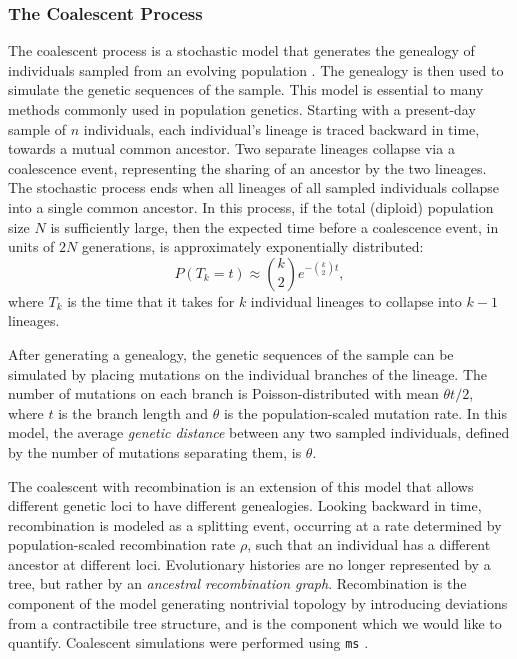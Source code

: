\subsubsection{The Coalescent Process}

The coalescent process is a stochastic model that generates the genealogy of individuals sampled from an evolving population \cite{Wakeley:2009}.
The genealogy is then used to simulate the genetic sequences of the sample.
This model is essential to many methods commonly used in population genetics.
Starting with a present-day sample of $n$ individuals, each individual's lineage is traced backward in time, towards a mutual common ancestor.
Two separate lineages collapse via a coalescence event, representing the sharing of an ancestor by the two lineages.
The stochastic process ends when all lineages of all sampled individuals collapse into a single common ancestor.
In this process, if the total (diploid) population size $N$ is sufficiently large, then the expected time before a coalescence event, in units of $2N$ generations, is approximately exponentially distributed:
\begin{equation}
P(T_{k}=t) \approx \binom{k}{2} e^{-\binom{k}{2} t},
\end{equation}
where $T_k$ is the time that it takes for $k$ individual lineages to collapse into $k-1$ lineages.

After generating a genealogy, the genetic sequences of the sample can be simulated by placing mutations on the individual branches of the lineage.
The number of mutations on each branch is Poisson-distributed with mean $\theta t / 2$, where $t$ is the branch length and $\theta$ is the population-scaled mutation rate.
In this model, the average \emph{genetic distance} between any two sampled individuals, defined by the number of mutations separating them, is $\theta$.

The coalescent with recombination is an extension of this model that allows different genetic loci to have different genealogies.
Looking backward in time, recombination is modeled as a splitting event, occurring at a rate determined by population-scaled recombination rate $\rho$, such that an individual has a different ancestor at different loci.
Evolutionary histories are no longer represented by a tree, but rather by an \emph{ancestral recombination graph}.
Recombination is the component of the model generating nontrivial topology by introducing deviations from a contractibile tree structure, and is the component which we would like to quantify.
Coalescent simulations were performed using \texttt{ms} \cite{Hudson:2002}.

